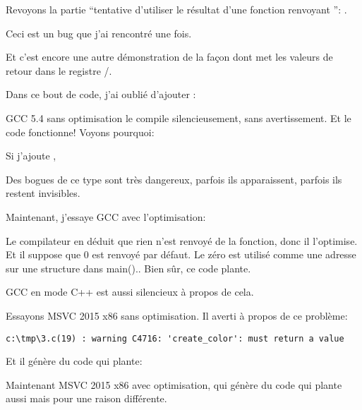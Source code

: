 \label{ForgottenReturn}

Revoyons la partie ``tentative d'utiliser le résultat d'une fonction renvoyant \Tvoid'': \label{UseResultOfVoidFunc}.

Ceci est un bug que j'ai rencontré une fois.

Et c'est encore une autre démonstration de la façon dont \CCpp met les valeurs de
retour dans le registre \EAX/\RAX.

Dans ce bout de code, j'ai oublié d'ajouter :



GCC 5.4 sans optimisation le compile silencieusement, sans avertissement.
Et le code fonctionne!
Voyons pourquoi:



Si j'ajoute , 



Des bogues de ce type sont très dangereux, parfois ils apparaissent, parfois ils
restent invisibles.

Maintenant, j'essaye GCC avec l'optimisation:



Le compilateur en déduit que rien n'est renvoyé de la fonction, donc il l'optimise.
Et il suppose que 0 est renvoyé par défaut. Le zéro est utilisé comme une adresse
sur une structure dans main()..
Bien sûr, ce code plante.

GCC en mode C++ est aussi silencieux à propos de cela.

Essayons MSVC 2015 x86 sans optimisation.
Il averti à propos de ce problème:

\begin{lstlisting}
c:\tmp\3.c(19) : warning C4716: 'create_color': must return a value
\end{lstlisting}

Et il génère du code qui plante:



Maintenant MSVC 2015 x86 avec optimisation, qui génère du code qui plante aussi mais
pour une raison différente.

